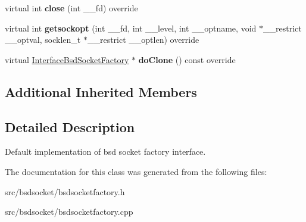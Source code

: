 \begin{DoxyCompactItemize}
\item 
\mbox{\label{classBsdSocketFactoryDefault_a74d05cce49a7760d8469f43f731f9a3d}} 
virtual int {\bfseries close} (int \+\_\+\+\_\+fd) override
\item 
\mbox{\label{classBsdSocketFactoryDefault_a92c76d39e336ac82954f869268df68a4}} 
virtual int {\bfseries getsockopt} (int \+\_\+\+\_\+fd, int \+\_\+\+\_\+level, int \+\_\+\+\_\+optname, void $\ast$\+\_\+\+\_\+restrict \+\_\+\+\_\+optval, socklen\+\_\+t $\ast$\+\_\+\+\_\+restrict \+\_\+\+\_\+optlen) override
\item 
\mbox{\label{classBsdSocketFactoryDefault_af92759f0383e9314f889482bd5b65e63}} 
virtual \hyperlink{classInterfaceBsdSocketFactory}{Interface\+Bsd\+Socket\+Factory} $\ast$ {\bfseries do\+Clone} () const override
\end{DoxyCompactItemize}
\subsection*{Additional Inherited Members}


\subsection{Detailed Description}
Default implementation of bsd socket factory interface. 

The documentation for this class was generated from the following files\+:\begin{DoxyCompactItemize}
\item 
src/bsdsocket/bsdsocketfactory.\+h\item 
src/bsdsocket/bsdsocketfactory.\+cpp\end{DoxyCompactItemize}
